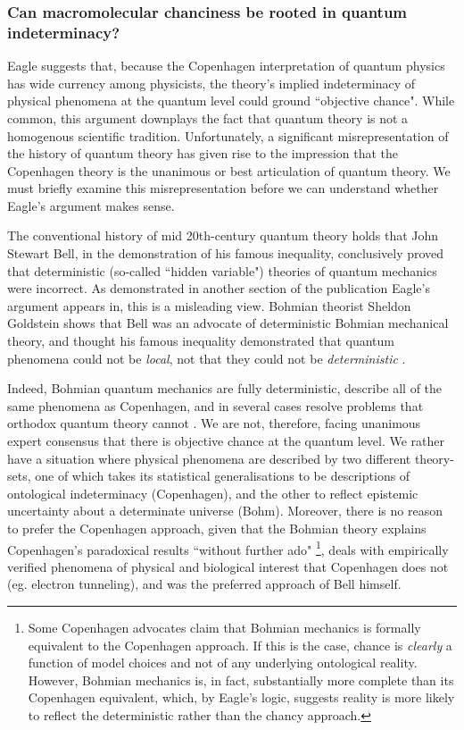 \subsubsection{Can macromolecular chanciness be rooted in quantum indeterminacy?}
Eagle suggests that, because the Copenhagen interpretation of quantum physics has wide currency among physicists, the theory's implied indeterminacy of physical phenomena at the quantum level could ground ``objective chance". While common, this argument downplays the fact that quantum theory is not a homogenous scientific tradition. Unfortunately, a significant misrepresentation of the history of quantum theory has given rise to the impression that the Copenhagen theory is the unanimous or best articulation of quantum theory. We must briefly examine this misrepresentation before we can understand whether Eagle's argument makes sense.

The conventional history of mid 20th-century quantum theory holds that John Stewart Bell, in the demonstration of his famous inequality, conclusively proved that deterministic (so-called ``hidden variable") theories of quantum mechanics were incorrect. As demonstrated in another section of the publication Eagle's argument appears in, this is a misleading view. Bohmian theorist Sheldon Goldstein shows that Bell was an advocate of deterministic Bohmian mechanical theory, and thought his famous inequality demonstrated that quantum phenomena could not be \textit{local}, not that they could not be \textit{deterministic} \cite{Goldstein2017}.

Indeed, Bohmian quantum mechanics are fully deterministic, describe all of the same phenomena as Copenhagen, and in several cases resolve problems that orthodox quantum theory cannot \cite{Goldstein2017}. We are not, therefore, facing unanimous expert consensus that there is objective chance at the quantum level. We rather have a situation where physical phenomena are  described by two different theory-sets, one of which takes its statistical generalisations to be descriptions of ontological indeterminacy (Copenhagen), and the other to reflect epistemic uncertainty about a determinate universe (Bohm). Moreover, there is no reason to prefer the Copenhagen approach, given that the Bohmian theory explains Copenhagen's paradoxical results ``without further ado" \cite{Goldstein2017}\footnote{Some Copenhagen advocates claim that Bohmian mechanics is formally equivalent to the Copenhagen approach. If this is the case, chance is \textit{clearly} a function of model choices and not of any underlying ontological reality. However, Bohmian mechanics is, in fact, substantially more complete than its Copenhagen equivalent, which, by Eagle's logic, suggests reality is more likely to reflect the deterministic rather than the chancy approach.}, deals with empirically verified phenomena of physical and biological interest that Copenhagen does not (eg. electron tunneling), and was the preferred approach of Bell himself.

